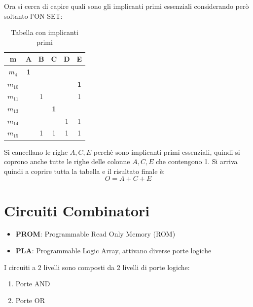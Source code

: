 \documentclass[a4paper]{article}
\theoremstyle{break}
\theoremstyle{break}
\theoremstyle{break}
\theoremstyle{break}
\begin{document}
\begin{example}
        Ora si cerca di capire quali sono gli implicanti primi essenziali considerando
        però soltanto l'ON-SET:
        \begin{table}[H]
            \begin{center}
                \begin{tabular}{c|c|c|c|c|c}
                    m & A & B & C & D & E \\
                    \hline
                    \( m_4 \) & \textbf{1} &  &  &  &  \\ 
                    \hline
                    \( m_{10} \) &  &  &  &  & \textbf{1} \\
                    \hline
                    \( m_{11} \) &  & 1 &  &  & 1 \\
                    \hline
                    \( m_{13} \) &  &  & \textbf{1} &  &  \\
                    \hline
                    \( m_{14} \) &  &  &  & 1 & 1 \\
                    \hline
                    \( m_{15} \) &  & 1 & 1 & 1 & 1 
                \end{tabular}
            \end{center}
            \caption{Tabella con implicanti primi}
        \end{table}
        Si cancellano le righe \( A, C, E \) perchè sono implicanti primi essenziali,
        quindi si coprono anche tutte le righe delle colonne \( A, C, E \) che
        contengono 1. Si arriva quindi a coprire tutta la tabella e il risultato
        finale è:
        \[
        O = A + C + E
        \] 
\end{example}



\section{Circuiti Combinatori}
\begin{itemize}
    \item \textbf{PROM}: Programmable Read Only Memory (ROM)
        \item \textbf{PLA}: Programmable Logic Array, attivano diverse porte logiche
\end{itemize}
I circuiti a 2 livelli sono composti da 2 livelli di porte logiche:
\begin{enumerate}
    \item Porte AND
        \item Porte OR
\end{enumerate}
\end{document}
